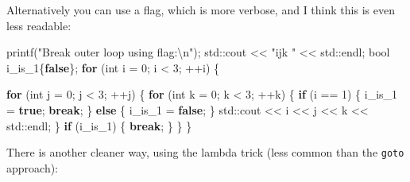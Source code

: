 \documentclass[
]{book}
\newenvironment{Shaded}{\begin{snugshade}}{\end{snugshade}}
\newcommand{\BuiltInTok}[1]{#1}
\newcommand{\ControlFlowTok}[1]{\textcolor[rgb]{0.13,0.29,0.53}{\textbf{#1}}}
\newcommand{\DataTypeTok}[1]{\textcolor[rgb]{0.13,0.29,0.53}{#1}}
\newcommand{\DecValTok}[1]{\textcolor[rgb]{0.00,0.00,0.81}{#1}}
\newcommand{\KeywordTok}[1]{\textcolor[rgb]{0.13,0.29,0.53}{\textbf{#1}}}
\newcommand{\NormalTok}[1]{#1}
\newcommand{\SpecialCharTok}[1]{\textcolor[rgb]{0.00,0.00,0.00}{#1}}
\newcommand{\StringTok}[1]{\textcolor[rgb]{0.31,0.60,0.02}{#1}}
\begin{document}
Alternatively you can use a flag, which is more verbose, and I think this is even less readable:

\begin{Shaded}
\begin{Highlighting}[]
\NormalTok{printf(}\StringTok{"Break outer loop using flag:}\SpecialCharTok{\textbackslash{}n}\StringTok{"}\NormalTok{);}
\BuiltInTok{std::}\NormalTok{cout \textless{}\textless{} }\StringTok{"ijk "}\NormalTok{ \textless{}\textless{} }\BuiltInTok{std::}\NormalTok{endl;}
\DataTypeTok{bool}\NormalTok{ i\_is\_1\{}\KeywordTok{false}\NormalTok{\};}
\ControlFlowTok{for}\NormalTok{ (}\DataTypeTok{int}\NormalTok{ i = }\DecValTok{0}\NormalTok{; i \textless{} }\DecValTok{3}\NormalTok{; ++i)}
\NormalTok{\{}

    \ControlFlowTok{for}\NormalTok{ (}\DataTypeTok{int}\NormalTok{ j = }\DecValTok{0}\NormalTok{; j \textless{} }\DecValTok{3}\NormalTok{; ++j)}
\NormalTok{    \{}
        \ControlFlowTok{for}\NormalTok{ (}\DataTypeTok{int}\NormalTok{ k = }\DecValTok{0}\NormalTok{; k \textless{} }\DecValTok{3}\NormalTok{; ++k)}
\NormalTok{        \{}
            \ControlFlowTok{if}\NormalTok{ (i == }\DecValTok{1}\NormalTok{)}
\NormalTok{            \{}
\NormalTok{                i\_is\_1 = }\KeywordTok{true}\NormalTok{;}
                \ControlFlowTok{break}\NormalTok{;}
\NormalTok{            \}}
            \ControlFlowTok{else}
\NormalTok{            \{}
\NormalTok{                i\_is\_1 = }\KeywordTok{false}\NormalTok{;}
\NormalTok{            \}}
            \BuiltInTok{std::}\NormalTok{cout \textless{}\textless{} i \textless{}\textless{} j \textless{}\textless{} k \textless{}\textless{} }\BuiltInTok{std::}\NormalTok{endl;}
\NormalTok{        \}}
        \ControlFlowTok{if}\NormalTok{ (i\_is\_1)}
\NormalTok{        \{}
            \ControlFlowTok{break}\NormalTok{;}
\NormalTok{        \}}
\NormalTok{    \}}
\NormalTok{\}}
\end{Highlighting}
\end{Shaded}

There is another cleaner way, using the lambda trick (less common than the \texttt{goto} approach):
\end{document}
